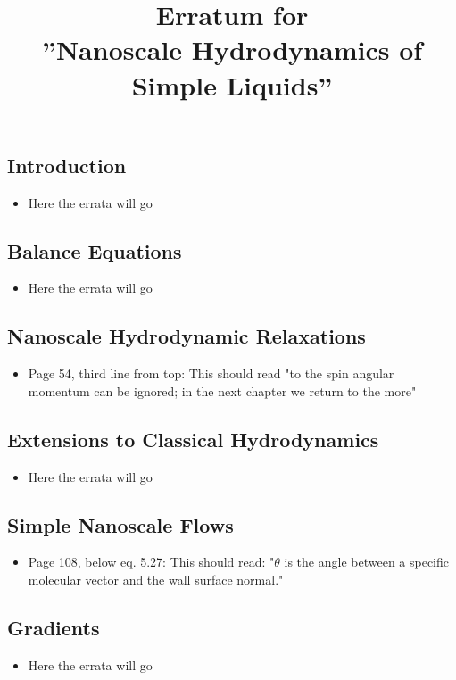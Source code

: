 \documentclass{article}
\title{Erratum for \\ ''Nanoscale Hydrodynamics of Simple Liquids''}
\date{}
\begin{document}
\maketitle

\subsection*{Introduction}
\begin{itemize}
\item Here the errata will go
\end{itemize}

\subsection*{Balance Equations}
\begin{itemize}
\item Here the errata will go
\end{itemize}

\subsection*{Nanoscale Hydrodynamic Relaxations}
\begin{itemize}
\item Page 54, third line from top: This should read "to the spin angular momentum can be ignored; in the next chapter we return to the more"
\end{itemize}

\subsection*{Extensions to Classical Hydrodynamics}
\begin{itemize}
\item Here the errata will go
\end{itemize}

\subsection*{Simple Nanoscale Flows}
\begin{itemize}
\item Page 108, below eq. 5.27: This should read: "$\theta$ is the angle between a specific molecular vector and the wall surface normal."
\end{itemize}

\subsection*{Gradients}
\begin{itemize}
\item Here the errata will go
\end{itemize}
\end{document}
